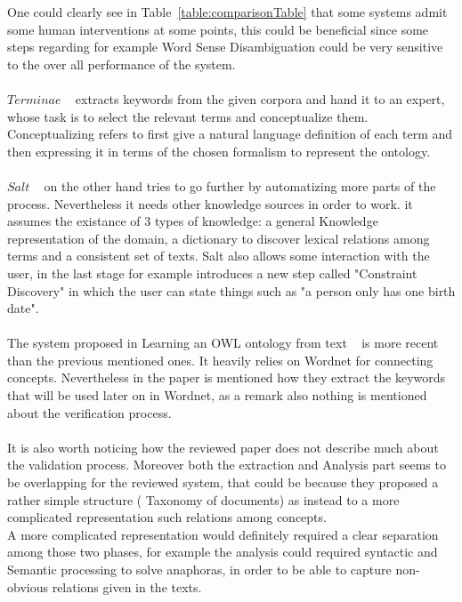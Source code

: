 \documentclass[4pt,a4paper,twocolumn]{article}
\begin{document}
One could clearly see in Table~\ref{table:comparisonTable} that some systems admit some human interventions at some points, this could be beneficial since some steps regarding for example Word Sense Disambiguation could be very sensitive to the over all performance of the system.\\
\\
$Terminae$ ~\cite{BiebowSzulman:99} extracts keywords from the given corpora and hand it to an expert, whose task is to select the relevant terms and conceptualize them. Conceptualizing refers to first give a natural language definition of each term and then expressing it in terms of the chosen formalism to represent the ontology.\\
\\
$Salt$ ~\cite{Lonsdale02pepperingknowledge} on the other hand tries to go further by automatizing more parts of the process. Nevertheless it needs other knowledge sources in order to work. it assumes the existance of 3 types of knowledge: a general Knowledge representation of the domain, a dictionary to discover lexical relations among terms and a consistent set of texts. Salt also allows some interaction with the user, in the last stage for example introduces a new step called "Constraint Discovery" in which the user can state things such as "a person only has one birth date". \\
\\
The system proposed in Learning an OWL ontology from text ~\cite{citeulike:136652} is more recent than the previous mentioned ones. It heavily relies on Wordnet for connecting concepts. Nevertheless in the paper is mentioned how they extract the keywords that will be used later on in Wordnet, as a remark also nothing is mentioned about the verification process.\\
\\
It is also worth noticing how the reviewed paper does not describe much about the validation process.
Moreover both the extraction and Analysis part seems to be overlapping for the reviewed system, that could be because they proposed a rather simple structure ( Taxonomy of documents) as instead to a more complicated representation such relations among concepts.\\
A more complicated representation would definitely required a clear separation among those two phases, for example the analysis could required syntactic and Semantic processing to solve anaphoras, in order to be able to capture non-obvious relations given in the texts.
\end{document}
